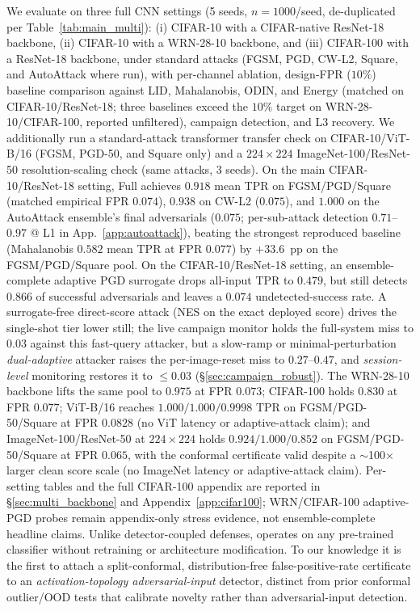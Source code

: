 We evaluate \prism on three full CNN settings (5 seeds,
$n{=}1000$/seed, de-duplicated per Table~\ref{tab:main_multi}):
(i) CIFAR-10 with a
CIFAR-native ResNet-18 backbone, (ii) CIFAR-10 with a WRN-28-10
backbone, and (iii) CIFAR-100 with a ResNet-18 backbone, under
standard attacks (FGSM, PGD, CW-L2, Square, and AutoAttack where run),
with per-channel
ablation, design-FPR ($10\%$) baseline comparison against LID,
Mahalanobis, ODIN, and Energy (matched on CIFAR-10/ResNet-18; three
baselines exceed the $10\%$ target on WRN-28-10/CIFAR-100, reported
unfiltered), campaign detection, and L3 recovery. We additionally run a
standard-attack transformer transfer check on CIFAR-10/ViT-B/16
(FGSM, PGD-50, and Square only) and a $224\times224$ ImageNet-100/ResNet-50
resolution-scaling check (same attacks, 3 seeds). On the main CIFAR-10/ResNet-18 setting,
\prism Full achieves
$0.918$ mean TPR on FGSM/PGD/Square (matched empirical FPR $0.074$),
$0.938$ on CW-L2 ($0.075$), and $1.000$ on the AutoAttack ensemble's
final adversarials ($0.075$; per-sub-attack detection $0.71$--$0.97$ @ L1
in App.~\ref{app:autoattack}), beating
the strongest reproduced baseline (Mahalanobis $0.582$ mean TPR at FPR
$0.077$) by $+33.6$~pp on the FGSM/PGD/Square pool. On the
CIFAR-10/ResNet-18 setting, an ensemble-complete adaptive PGD surrogate
drops all-input TPR to
$0.479$, but \prism still detects $0.866$ of successful adversarials
and leaves a $0.074$ undetected-success rate. A surrogate-free
direct-score attack (NES on the exact deployed score) drives the
single-shot tier lower still; the live \sacd campaign monitor holds the
full-system miss to $0.03$ against this fast-query attacker, but a
slow-ramp or minimal-perturbation \emph{dual-adaptive} attacker raises the
per-image-reset miss to $0.27$--$0.47$, and \emph{session-level} monitoring
restores it to ${\le}0.03$ (\S\ref{sec:campaign_robust}). The WRN-28-10
backbone lifts the same pool to $0.975$ at FPR $0.073$; CIFAR-100 holds
$0.830$ at FPR $0.077$; ViT-B/16 reaches
$1.000/1.000/0.9998$ TPR on FGSM/PGD-50/Square at FPR $0.0828$
(no ViT latency or adaptive-attack claim); and ImageNet-100/ResNet-50 at
$224\times224$ holds $0.924/1.000/0.852$ on FGSM/PGD-50/Square at FPR
$0.065$, with the conformal certificate valid despite a $\sim$100$\times$
larger clean score scale (no ImageNet latency or adaptive-attack claim). Per-setting tables and the
full CIFAR-100 appendix are reported in \S\ref{sec:multi_backbone} and
Appendix~\ref{app:cifar100}; WRN/CIFAR-100 adaptive-PGD probes remain
appendix-only stress evidence, not ensemble-complete headline claims.
Unlike detector-coupled defenses, \prism operates on any pre-trained
classifier without retraining or architecture modification. To our
knowledge it is the first to attach a split-conformal, distribution-free
false-positive-rate certificate to an \emph{activation-topology
adversarial-input} detector, distinct from prior conformal outlier/OOD
tests \cite{kaur2022idecode,bates2023outliers} that calibrate novelty
rather than adversarial-input detection.
